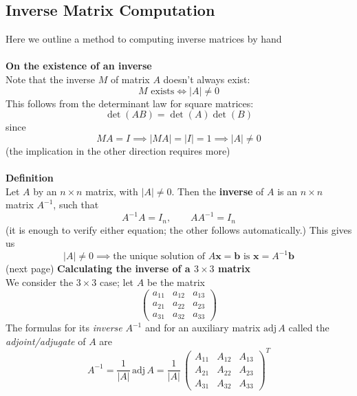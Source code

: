 \documentclass{report}
\begin{document}
\subsection{Inverse Matrix Computation}
Here we outline a method to computing inverse matrices by hand\\
\vspace{1mm}\\
\textbf{On the existence of an inverse}\\
Note that the inverse $M$ of matrix $A$ doesn't always exist:
\begin{equation*}
M\text{ exists}\iff|A|\neq0
\end{equation*}
This follows from the determinant law for square matrices:
\begin{equation*}
\det(AB)=\det(A)\det(B)
\end{equation*}
since 
\begin{equation*}
MA=I\implies|MA|=|I|=1\implies|A|\neq0
\end{equation*}
(the implication in the other direction requires more)\\
\vspace{1mm}\\
\textbf{Definition}\\
Let $A$ by an $n\times n$ matrix, with $|A|\neq0$. Then the \textbf{inverse} of $A$ 
is an $n\times n$ matrix $A^{-1}$, such that 
\begin{equation*}
A^{-1}A=I_n,\quad\quad AA^{-1}=I_n
\end{equation*}
(it is enough to verify either equation; the other follows automatically.) This gives us
\begin{equation*}
|A|\neq0\implies\text{the unique solution of }A\mathbf{x=b}\text{ is }\mathbf{x}=A^{-1}\mathbf{b}
\end{equation*}
(next page)
\newpage
\noindent\textbf{Calculating the inverse of a $3\times3$ matrix}\\
We consider the $3\times3$ case; let $A$ be the matrix
\begin{equation*}
\begin{pmatrix}
a_{11}&a_{12}&a_{13}\\
a_{21}&a_{22}&a_{23}\\
a_{31}&a_{32}&a_{33}
\end{pmatrix}
\end{equation*}
The formulas for its 
\textit{inverse} $A^{-1}$ and for an auxiliary matrix 
$\text{adj}\,A$ called the \textit{adjoint/adjugate} of $A$ are
\begin{equation*}
A^{-1}=\frac{1}{|A|}\,\text{adj}\,A=\frac{1}{|A|}\,
\begin{pmatrix}
A_{11}&A_{12}&A_{13}\\
A_{21}&A_{22}&A_{23}\\
A_{31}&A_{32}&A_{33}
\end{pmatrix}^T
\end{equation*}
\end{document}
